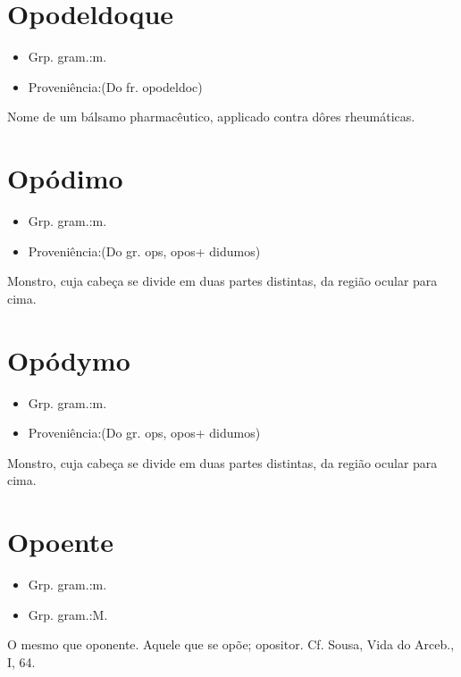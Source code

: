 \section{Opodeldoque}
\begin{itemize}
\item {Grp. gram.:m.}
\end{itemize}
\begin{itemize}
\item {Proveniência:(Do fr. \textunderscore opodeldoc\textunderscore )}
\end{itemize}
Nome de um bálsamo pharmacêutico, applicado contra dôres rheumáticas.
\section{Opódimo}
\begin{itemize}
\item {Grp. gram.:m.}
\end{itemize}
\begin{itemize}
\item {Proveniência:(Do gr. \textunderscore ops\textunderscore , \textunderscore opos\textunderscore  + \textunderscore didumos\textunderscore )}
\end{itemize}
Monstro, cuja cabeça se divide em duas partes distintas, da região ocular para cima.
\section{Opódymo}
\begin{itemize}
\item {Grp. gram.:m.}
\end{itemize}
\begin{itemize}
\item {Proveniência:(Do gr. \textunderscore ops\textunderscore , \textunderscore opos\textunderscore  + \textunderscore didumos\textunderscore )}
\end{itemize}
Monstro, cuja cabeça se divide em duas partes distintas, da região ocular para cima.
\section{Opoente}
\begin{itemize}
\item {Grp. gram.:m.}
\end{itemize}
\begin{itemize}
\item {Grp. gram.:M.}
\end{itemize}
O mesmo que \textunderscore oponente\textunderscore .
Aquele que se opõe; opositor. Cf. Sousa, \textunderscore Vida do Arceb.\textunderscore , I, 64.
